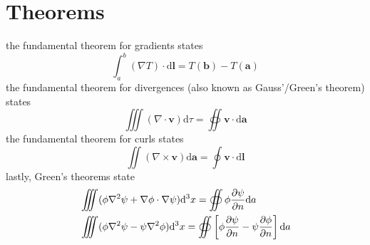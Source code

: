\documentclass[oneside]{book}
\numberwithin{equation}{chapter} %
\newcommand{\pde}[2]{\ensuremath{%
		\frac{\partial #1}{\partial #2}}}
\begin{document}
\section{Theorems}
the fundamental theorem for gradients states
\begin{equation}
	\int^b_a(\nabla T)\cdot\mathrm d\mathbf l=T(\mathbf b)-T(\mathbf a)
\end{equation}
the fundamental theorem for divergences (also known as Gauss'/Green's theorem) states
\begin{equation}
	\iiint(\nabla\cdot\mathbf v)\mathrm d\tau=\oiint \mathbf v\cdot\mathrm d\mathbf a
\end{equation}
the fundamental theorem for curls states
\begin{equation}
	\iint(\nabla\times\mathbf v)\mathrm d\mathbf a=\oint\mathbf v\cdot\mathrm d\mathbf l
\end{equation}
lastly, Green's theorems state
\begin{align}
	&\iiint(\phi\nabla^2\psi+\nabla\phi\cdot\nabla\psi)\mathrm d^3x=\oiint\phi\pde{\psi}{n}\mathrm da\\
	&\iiint(\phi\nabla^2\psi-\psi\nabla^2\phi)\mathrm d^3x=\oiint\left[\phi\pde{\psi}{n}-\psi\pde{\phi}{n}\right]\mathrm da
\end{align}

\end{document}
